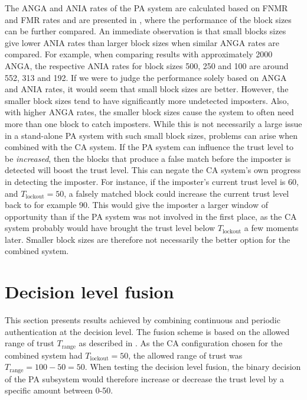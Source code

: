 The ANGA and ANIA rates of the PA system are calculated based on FNMR and FMR rates and are presented in , where the performance of the block sizes can be further compared.
An immediate observation is that small blocks sizes give lower ANIA rates than larger block sizes when similar ANGA rates are compared.
For example, when comparing results with approximately 2000 ANGA, the respective ANIA rates for block sizes 500, 250 and 100 are around 552, 313 and 192.
If we were to judge the performance solely based on ANGA and ANIA rates, it would seem that small block sizes are better.
However, the smaller block sizes tend to have significantly more undetected imposters.
Also, with higher ANGA rates, the smaller block sizes cause the system to often need more than one block to catch imposters.
While this is not necessarily a large issue in a stand-alone PA system with such small block sizes, problems can arise when combined with the CA system.
If the PA system can influence the trust level to be \textit{increased}, then the blocks that produce a false match before the imposter is detected will boost the trust level.
This can negate the CA system's own progress in detecting the imposter.
For instance, if the imposter's current trust level is 60, and $T_{\text{lockout}}=50$, a falsely matched block could increase the current trust level back to for example 90.
This would give the imposter a larger window of opportunity than if the PA system was not involved in the first place, as the CA system probably would have brought the trust level below $T_{\text{lockout}}$ a few moments later.
Smaller block sizes are therefore not necessarily the better option for the combined system.


\section{Decision level fusion}
\label{sec:analysis-decision-lvl}
This section presents results achieved by combining continuous and periodic authentication at the decision level.
The fusion scheme is based on the allowed range of trust $T_\text{range}$ as described in .
As the CA configuration chosen for the combined system had $T_{\text{lockout}} = 50$, the allowed range of trust was $T_{\text{range}} = 100-50 = 50$.
When testing the decision level fusion, the binary decision of the PA subsystem would therefore increase or decrease the trust level by a specific amount between 0-50.




